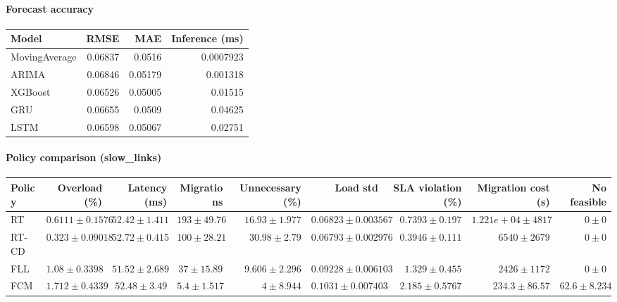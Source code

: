 \paragraph{Forecast accuracy}
\begin{tabular}{lrrr}
\hline
Model & RMSE & MAE & Inference (ms) \\
\hline
MovingAverage & 0.06837 & 0.0516 & 0.0007923 \\
ARIMA & 0.06846 & 0.05179 & 0.001318 \\
XGBoost & 0.06526 & 0.05005 & 0.01515 \\
GRU & 0.06655 & 0.0509 & 0.04625 \\
LSTM & 0.06598 & 0.05067 & 0.02751 \\
\hline
\end{tabular}


\paragraph{Policy comparison (slow_links)}
\begin{tabular}{lrrrrrrrr}
\hline
Policy & Overload (\%) & Latency (ms) & Migrations & Unnecessary (\%) & Load std & SLA violation (\%) & Migration cost (s) & No feasible \\
\hline
RT & $0.6111 \pm 0.1576$ & $52.42 \pm 1.411$ & $193 \pm 49.76$ & $16.93 \pm 1.977$ & $0.06823 \pm 0.003567$ & $0.7393 \pm 0.197$ & $1.221e+04 \pm 4817$ & $0 \pm 0$ \\
RT-CD & $0.323 \pm 0.09018$ & $52.72 \pm 0.415$ & $100 \pm 28.21$ & $30.98 \pm 2.79$ & $0.06793 \pm 0.002976$ & $0.3946 \pm 0.111$ & $6540 \pm 2679$ & $0 \pm 0$ \\
FLL & $1.08 \pm 0.3398$ & $51.52 \pm 2.689$ & $37 \pm 15.89$ & $9.606 \pm 2.296$ & $0.09228 \pm 0.006103$ & $1.329 \pm 0.455$ & $2426 \pm 1172$ & $0 \pm 0$ \\
FCM & $1.712 \pm 0.4339$ & $52.48 \pm 3.49$ & $5.4 \pm 1.517$ & $4 \pm 8.944$ & $0.1031 \pm 0.007403$ & $2.185 \pm 0.5767$ & $234.3 \pm 86.57$ & $62.6 \pm 8.234$ \\
\hline
\end{tabular}


